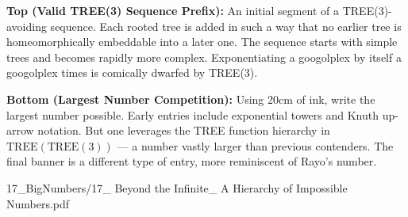 \begin{SideNotePage}{
  \textbf{Top (Valid TREE(3) Sequence Prefix):}  
  An initial segment of a TREE(3)-avoiding sequence. Each rooted tree is added in such a way that no earlier tree is homeomorphically embeddable into a later one. The sequence starts with simple trees and becomes rapidly more complex. Exponentiating a googolplex by itself a googolplex times is comically dwarfed by TREE(3). \par

  \textbf{Bottom (Largest Number Competition):}  
  Using 20cm of ink, write the largest number possible. Early entries include exponential towers and Knuth up-arrow notation. But one leverages the TREE function hierarchy in $\text{TREE}(\text{TREE}(3))$ — a number vastly larger than previous contenders. The final banner is a different type of entry, more reminiscent of Rayo's number. \par
}{17_BigNumbers/17_ Beyond the Infinite_ A Hierarchy of Impossible Numbers.pdf}
\end{SideNotePage}


